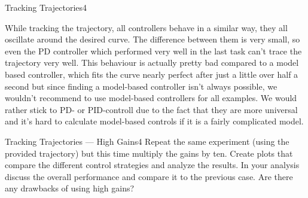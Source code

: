 \begin{questions}
\begin{question}{Tracking Trajectories}{4}
\begin{answer}
While tracking the trajectory, all controllers behave in a similar way, they all oscillate around the desired curve. The difference between them is very small, so even the PD controller which performed very well in the last task can't trace the trajectory very well. This behaviour is actually pretty bad compared to a model based controller, which fits the curve nearly perfect after just a little over half a second but since finding a model-based controller isn't always possible, we wouldn't recommend to use model-based controllers for all examples. We would rather stick to PD- or PID-controll due to the fact that they are more universal and it's hard to calculate model-based controls if it is a fairly complicated model.

\end{answer}
		
	\end{question}
	
	
	\begin{question}{Tracking Trajectories --- High Gains}{4}
		Repeat the same experiment (using the provided trajectory) but this time multiply the gains by ten. Create plots that compare the different control strategies and analyze the results. In your analysis discuss the overall performance and compare it to the previous case. Are there any drawbacks of using high gains?
		

\end{question}
\end{questions}
